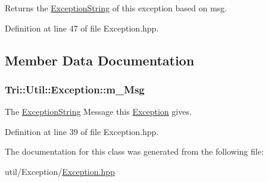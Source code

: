 Returns the \hyperlink{namespace_tri_1_1_util_ac7d0a48237beb68f23ba39a6ad03b4bc}{Exception\+String} of this exception based on msg. 



Definition at line 47 of file Exception.\+hpp.



\subsection{Member Data Documentation}
\hypertarget{class_tri_1_1_util_1_1_exception_a44c5170a7b4f36e26f60be26528660cb}{}
\subsubsection[{m\+\_\+\+Msg}]{ Tri\+::\+Util\+::\+Exception\+::m\+\_\+\+Msg\hspace{0.3cm}{\ttfamily [protected]}}\label{class_tri_1_1_util_1_1_exception_a44c5170a7b4f36e26f60be26528660cb}


The \hyperlink{namespace_tri_1_1_util_ac7d0a48237beb68f23ba39a6ad03b4bc}{Exception\+String} Message this \hyperlink{class_tri_1_1_util_1_1_exception}{Exception} gives. 



Definition at line 39 of file Exception.\+hpp.



The documentation for this class was generated from the following file\+:\begin{DoxyCompactItemize}
\item 
util/\+Exception/\hyperlink{_exception_8hpp}{Exception.\+hpp}\end{DoxyCompactItemize}
